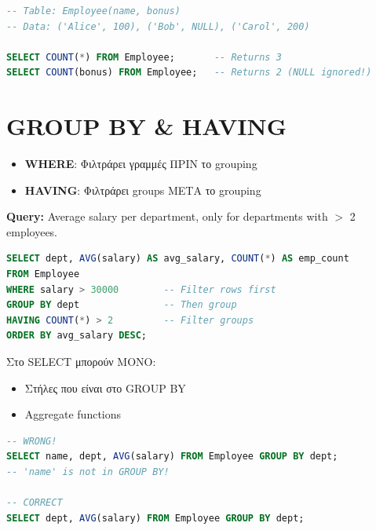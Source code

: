 \begin{warningbox}
\begin{lstlisting}[language=SQL]
-- Table: Employee(name, bonus)
-- Data: ('Alice', 100), ('Bob', NULL), ('Carol', 200)

SELECT COUNT(*) FROM Employee;       -- Returns 3
SELECT COUNT(bonus) FROM Employee;   -- Returns 2 (NULL ignored!)
\end{lstlisting}
\end{warningbox}

\section{GROUP BY \& HAVING}

\begin{definitionbox}
\begin{itemize}
    \item \textbf{WHERE}: Φιλτράρει γραμμές ΠΡΙΝ το grouping
    \item \textbf{HAVING}: Φιλτράρει groups ΜΕΤΑ το grouping
\end{itemize}
\end{definitionbox}

\begin{examplebox}
\textbf{Query:} Average salary per department, only for departments with $>$ 2 employees.

\begin{lstlisting}[language=SQL]
SELECT dept, AVG(salary) AS avg_salary, COUNT(*) AS emp_count
FROM Employee
WHERE salary > 30000        -- Filter rows first
GROUP BY dept               -- Then group
HAVING COUNT(*) > 2         -- Filter groups
ORDER BY avg_salary DESC;
\end{lstlisting}
\end{examplebox}

\begin{warningbox}
Στο SELECT μπορούν ΜΟΝΟ:
\begin{itemize}
    \item Στήλες που είναι στο GROUP BY
    \item Aggregate functions
\end{itemize}

\begin{lstlisting}[language=SQL]
-- WRONG!
SELECT name, dept, AVG(salary) FROM Employee GROUP BY dept;
-- 'name' is not in GROUP BY!

-- CORRECT
SELECT dept, AVG(salary) FROM Employee GROUP BY dept;
\end{lstlisting}
\end{warningbox}

